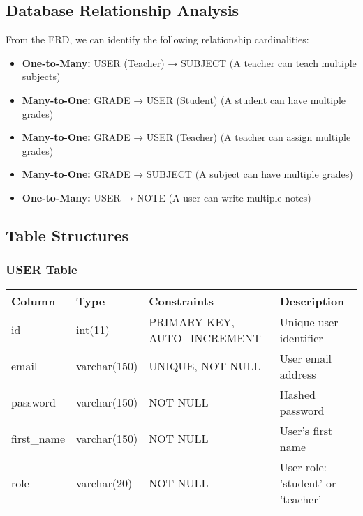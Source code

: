 \documentclass[12pt,a4paper]{article}
\begin{document}
\subsection{Database Relationship Analysis}

From the ERD, we can identify the following relationship cardinalities:

\begin{itemize}
    \item \textbf{One-to-Many:} USER (Teacher) → SUBJECT (A teacher can teach multiple subjects)
    \item \textbf{Many-to-One:} GRADE → USER (Student) (A student can have multiple grades)
    \item \textbf{Many-to-One:} GRADE → USER (Teacher) (A teacher can assign multiple grades)
    \item \textbf{Many-to-One:} GRADE → SUBJECT (A subject can have multiple grades)
    \item \textbf{One-to-Many:} USER → NOTE (A user can write multiple notes)
\end{itemize}

\subsection{Table Structures}

\subsubsection{USER Table}
\begin{longtable}{|p{3cm}|p{2cm}|p{2cm}|p{6cm}|}
\hline
\textbf{Column} & \textbf{Type} & \textbf{Constraints} & \textbf{Description} \\
\hline
\endhead
id & int(11) & PRIMARY KEY, AUTO\_INCREMENT & Unique user identifier \\
\hline
email & varchar(150) & UNIQUE, NOT NULL & User email address \\
\hline
password & varchar(150) & NOT NULL & Hashed password \\
\hline
first\_name & varchar(150) & NOT NULL & User's first name \\
\hline
role & varchar(20) & NOT NULL & User role: 'student' or 'teacher' \\
\hline
\end{longtable}
\end{document}
